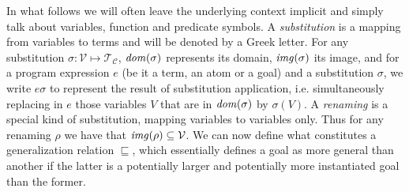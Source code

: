 

In what follows we will often leave the underlying context implicit and simply talk about variables, function and predicate symbols. A \textit{substitution} is a mapping from variables to terms and will be denoted by a Greek letter. For any substitution $\sigma : \mathcal{V} \mapsto \mathcal{T}_\mathcal{C}$, $\mathit{dom}(\sigma)$ represents its domain, $\mathit{img}(\sigma)$ its image, and for a program expression $e$ (be it a term, an atom or a goal) and a substitution $\sigma$, we write $e\sigma$ to represent the result of substitution application, i.e. simultaneously replacing in $e$ those variables $V$ that are in $\mathit{dom}(\sigma)$ by $\sigma(V)$. A \textit{renaming} is a special kind of substitution, mapping variables to variables only. Thus for any renaming $\rho$ we have that $\mathit{img}(\rho) \subseteq \mathcal{V}$. %
We can now define what constitutes a generalization relation $\sqsubseteq$, which essentially defines a goal as more general than another if the latter is a potentially larger and potentially more instantiated goal than the former. 

